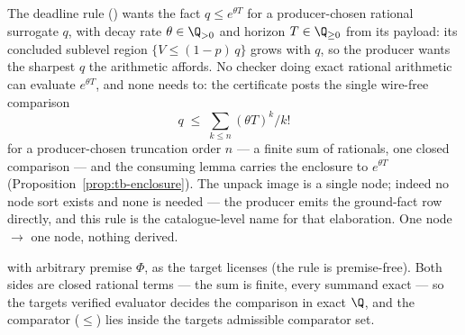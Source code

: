 

\begin{brecipe}
\label{rec:tb-template}
The deadline rule () wants the fact
$q \le e^{\theta T}$ for a producer-chosen rational surrogate $q$, with
decay rate $\theta \in \Q_{> 0}$ and horizon $T \in \Q_{\ge 0}$ from its
payload: its concluded sublevel region $\{V \le (1-p)\,q\}$ grows with
$q$, so the producer wants the sharpest $q$ the arithmetic affords. No
checker doing exact rational arithmetic can evaluate $e^{\theta T}$, and
none needs to: the certificate posts the single wire-free comparison
\[
q \;\le\; \textstyle\sum_{k \le n} (\theta T)^k / k!
\]
for a producer-chosen truncation order $n$ --- a finite sum of
rationals, one closed comparison --- and the consuming lemma carries the
enclosure to $e^{\theta T}$ (Proposition~\ref{prop:tb-enclosure}). The
unpack image is a single  node; indeed no
 node sort exists and none is needed --- the
producer emits the ground-fact row directly, and this rule is the
catalogue-level name for that elaboration. One node $\to$ one node,
nothing derived.
\end{brecipe}

\begin{brecipe}\label{rec:tb-filled}
\begin{mathpar}
\end{mathpar}
with arbitrary premise $\Phi$, as the target licenses (the rule is
premise-free). Both sides are closed rational terms --- the sum is
finite, every summand exact --- so the target\textquotesingle s verified
evaluator decides the comparison in exact $\Q$, and the comparator
($\le$) lies inside the target\textquotesingle s admissible comparator
set.
\end{brecipe}


